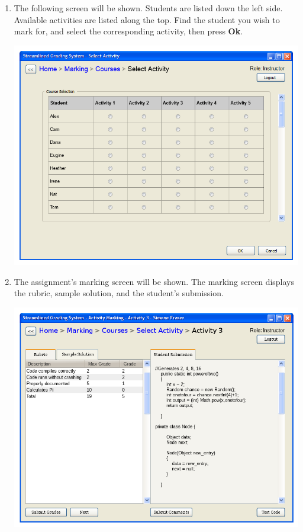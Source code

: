\documentclass{article}
\begin{document}
\begin{enumerate}
\begin{center}
     \label{courseSel}
    \end{center}
  \item The following screen will be shown.  Students are listed down the left
    side. Available activities are listed along the top.  Find the student you
    wish to mark for, and select the corresponding activity, then press \textbf{Ok}.
  \begin{center} 
    \includegraphics[scale=0.55]{../images/UIMockups/pngs/StudentActivitySelectionM}
    \label{actSel}
  \end{center}
  \item The assignment's marking screen will be shown.  The marking screen
    displays the rubric, sample solution, and the student's submission.
  \begin{center} 
   \includegraphics[scale=0.55]{../images/UIMockups/pngs/activityMarking}

\end{center}
\end{enumerate}
\end{document}
